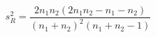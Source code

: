 \documentclass[12pt]{article}
\begin{document}
\pagestyle{empty}
\Large
{}
\pagecolor{ehandbook}

\boldmath
\[
s_{R}^2 = \frac{2 n_1 n_2(2 n_1 n_2 - n_1 - n_2)}
                    {(n_1 + n_2)^2 (n_1 + n_2 - 1)}
\]
\end{document}
